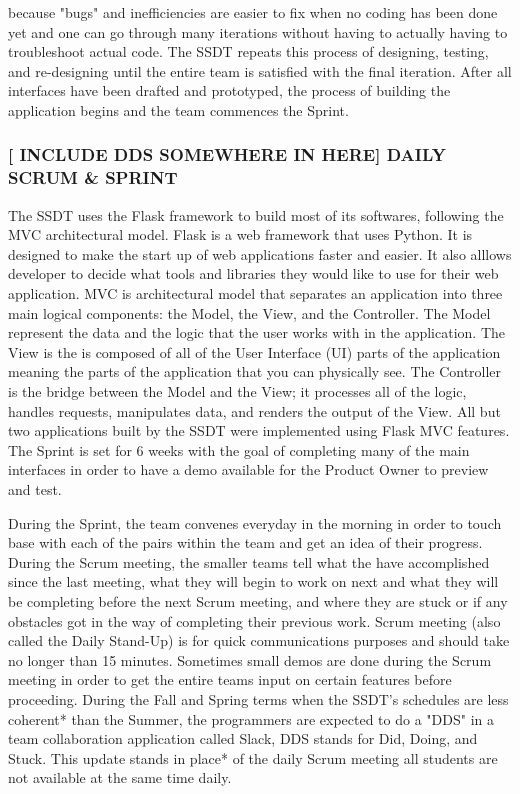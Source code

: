 because "bugs" and inefficiencies are easier to fix when no coding has been done yet and one can go through many iterations without having to actually having to troubleshoot actual code. The SSDT repeats this process of designing, testing, and re-designing until the entire team is satisfied with the final iteration. After all interfaces have been drafted and prototyped, the process of building the application begins and the team commences the Sprint.

\subsubsection{[ INCLUDE DDS SOMEWHERE IN HERE] DAILY SCRUM & SPRINT}
The SSDT uses the Flask framework to build most of its softwares, following the MVC architectural model. Flask is a web framework that uses Python. It is designed to make the start up of web applications faster and easier. It also alllows developer to decide what tools and libraries they would like to use for their web application. MVC is architectural model that separates an application into three main logical components: the Model, the View, and the Controller. The Model represent the data and the logic that the user works with in the application. The View is the is composed of all of the User Interface (UI) parts of the application meaning the parts of the application that you can physically see. The Controller is the bridge between the Model and the View; it processes all of the logic, handles requests, manipulates data, and renders the output of the View. All but two applications built by the SSDT were implemented using Flask MVC features. The Sprint is set for 6 weeks with the goal of completing many of the main interfaces in order to have a demo available for  the Product Owner to preview and test.

During the Sprint, the team convenes everyday in the morning in order to touch base with each of the pairs within the team and get an idea of their progress. During the Scrum meeting, the smaller teams tell what the have accomplished since the last meeting, what they will begin to work on next and what they will be completing before the next Scrum meeting, and where they are stuck or if any obstacles got in the way of completing their previous work. Scrum meeting (also called the Daily Stand-Up) is for quick communications purposes and should take no longer than 15 minutes. Sometimes small demos are done during the Scrum meeting in order to get the entire teams input on certain features before proceeding. During the Fall and Spring terms when the SSDT's schedules are less coherent* than the Summer, the programmers are expected to do a "DDS" in a team collaboration application called Slack, DDS stands for Did, Doing, and Stuck. This update stands in place* of the daily Scrum meeting all students are not available at the same time daily.

